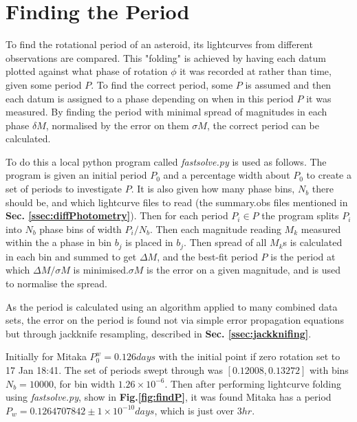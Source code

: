 \documentclass[10pt,twocolumn]{revtex4}    %
\newcommand{\reffig}[1]{\textbf{Fig.#1}}
\newcommand{\refsec}[1]{\textbf{Sec. #1}}
\begin{document}
\section{Finding the Period}\label{ssec:findP}

To find the rotational period of an asteroid, its lightcurves from different observations are compared. This "folding" is achieved by having each datum plotted against what phase of rotation $\phi$ it was recorded at rather than time, given some period $P$. To find the correct period, some $P$ is assumed and then each datum is assigned to a phase depending on when in this period $P$ it was measured. By finding the period with minimal spread of magnitudes in each phase $\delta M$, normalised by the error on them $\sigma M$, the correct period can be calculated.

To do this a local python program called \textit{fastsolve.py} is used as follows. The program is given an initial period $P_0$ and a percentage width about $P_0$ to create a set of periods to investigate ${P}$. It is also given how many phase bins, $N_b$ there should be, and which lightcurve files to read (the summary.obs files mentioned in \textbf{Sec. \ref{ssec:diffPhotometry}}). Then for each period $P_i \in {P}$ the program splits $P_i$ into $N_b$ phase bins of width $P_i/N_b$. Then each magnitude reading $M_k$ measured within the a phase in bin $b_j$ is placed in $b_j$. Then spread of all $M_k$s is calculated in each bin and summed to get $\Delta M$, and the best-fit period $P$ is the period at which $\Delta M/\sigma M$ is minimised.$\sigma M$ is the error on a given magnitude, and is used to normalise the spread. 

As the period is calculated using an algorithm applied to many combined data sets, the error on the period is found not via simple error propagation equations but through jackknife resampling, described in \refsec{\ref{ssec:jackknifing}}. 


Initially for Mitaka $P^w_0 = 0.126 days$ with the initial point if zero rotation set to 17 Jan 18:41. The set of periods swept through was $[0.12008, 0.13272]$ with bins $N_b = 10000$, for bin width $1.26\times10^{-6}$. Then after performing lightcurve folding using \textit{fastsolve.py}, show in \reffig{\ref{fig:findP}}, it was found Mitaka has a period $P_w = 0.1264707842 \pm 1\times10^{-10}days$, which is just over $3hr$.
\end{document}
